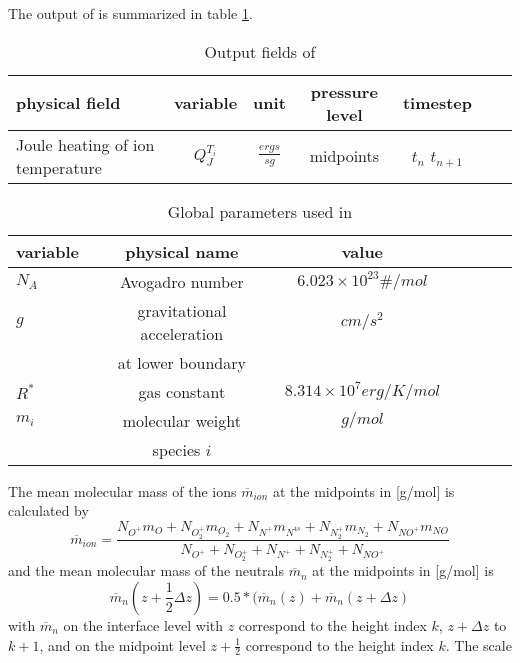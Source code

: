 %
The output of  is summarized in table
\ref{tab:output_qjoule_ti}.
%
\begin{table}[tb]
\begin{tabular}{|p{3.5cm} ||c|c|c|c|c|c|} \hline
physical field               & variable        & unit&pressure
level& timestep
\\ \hline \hline
%
Joule heating of ion temperature & $Q_J^{T_i}$     & $\frac{ergs}{s
g}$   & midpoints   & $t_n$ $t_{n+1}$
 \\ \hline
\end{tabular}
\caption{Output fields of }
\label{tab:output_qjoule_ti}
\end{table}
%
\begin{table}[tb]
\begin{tabular}{|p{3.5cm} ||c|c|c|c|c|c|} \hline
variable               & physical name        & value \\ \hline
\hline
%
$N_A$   &  Avogadro number         & $6.023 \times 10^{23} \#/mol$  \\
$g$     &  gravitational acceleration                   & $cm/s^2$  \\
{}      &  at lower boundary  &   \\
$R^*$   &  gas constant       & $8.314 \times 10^{7} erg/K/mol$  \\
$m_{i}$ &  molecular weight         & $g/mol$ \\
        & species $i$         &
 \\ \hline
\end{tabular}
\caption{Global parameters used in }
\label{tab:parameters_qjoule_ti}
\end{table}
%
The mean molecular mass of the ions $\overline{m}_{ion}$ at the
midpoints in [g/mol] is calculated by
%
\begin{equation}
  \overline{m}_{ion}=\frac{N_{O^+} m_O+N_{O_2^+}m_{O_2}+N_{N^+}m_{N^{4s}}+
        N_{N_2^+}m_{N_2}+N_{NO^+}m_{NO}}
  {N_{O^+}+N_{O_2^+}+N_{N^+}+N_{N_2^+}+N_{NO^+}}
\end{equation}
%
and the mean molecular mass of the neutrals $\overline{m}_n$ at the
midpoints in [g/mol] is
%
\begin{equation}
 \overline{m}_{n}(z+\frac{1}{2} \Delta z) = 0.5*(\overline{m}_{n}(z)+\overline{m}_{n}(z+\Delta z)
\end{equation}
%
with $\overline{m}_n$ on the interface level with $z$ correspond to
the height index $k$, $z+\Delta z$ to $k+1$, and on the midpoint
level $z+\frac{1}{2}$ correspond to the height index $k$. The scale

